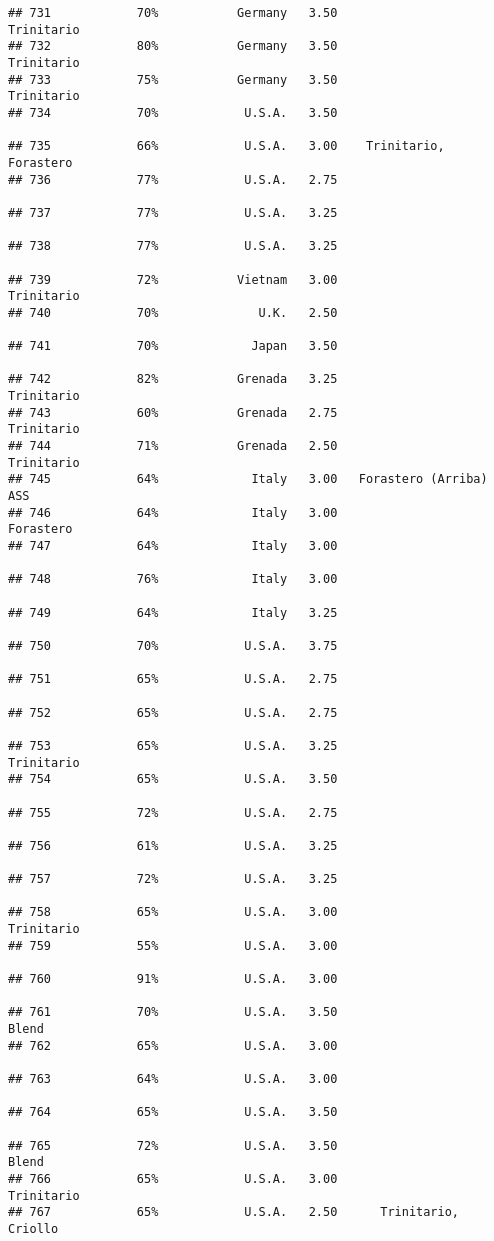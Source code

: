 \documentclass[
]{article}
\begin{document}
\begin{verbatim}
## 731            70%           Germany   3.50               Trinitario
## 732            80%           Germany   3.50               Trinitario
## 733            75%           Germany   3.50               Trinitario
## 734            70%            U.S.A.   3.50                         
## 735            66%            U.S.A.   3.00    Trinitario, Forastero
## 736            77%            U.S.A.   2.75                         
## 737            77%            U.S.A.   3.25                         
## 738            77%            U.S.A.   3.25                         
## 739            72%           Vietnam   3.00               Trinitario
## 740            70%              U.K.   2.50                         
## 741            70%             Japan   3.50                         
## 742            82%           Grenada   3.25               Trinitario
## 743            60%           Grenada   2.75               Trinitario
## 744            71%           Grenada   2.50               Trinitario
## 745            64%             Italy   3.00   Forastero (Arriba) ASS
## 746            64%             Italy   3.00                Forastero
## 747            64%             Italy   3.00                         
## 748            76%             Italy   3.00                         
## 749            64%             Italy   3.25                         
## 750            70%            U.S.A.   3.75                         
## 751            65%            U.S.A.   2.75                         
## 752            65%            U.S.A.   2.75                         
## 753            65%            U.S.A.   3.25               Trinitario
## 754            65%            U.S.A.   3.50                         
## 755            72%            U.S.A.   2.75                         
## 756            61%            U.S.A.   3.25                         
## 757            72%            U.S.A.   3.25                         
## 758            65%            U.S.A.   3.00               Trinitario
## 759            55%            U.S.A.   3.00                         
## 760            91%            U.S.A.   3.00                         
## 761            70%            U.S.A.   3.50                    Blend
## 762            65%            U.S.A.   3.00                         
## 763            64%            U.S.A.   3.00                         
## 764            65%            U.S.A.   3.50                         
## 765            72%            U.S.A.   3.50                    Blend
## 766            65%            U.S.A.   3.00               Trinitario
## 767            65%            U.S.A.   2.50      Trinitario, Criollo

\end{verbatim}
\end{document}
